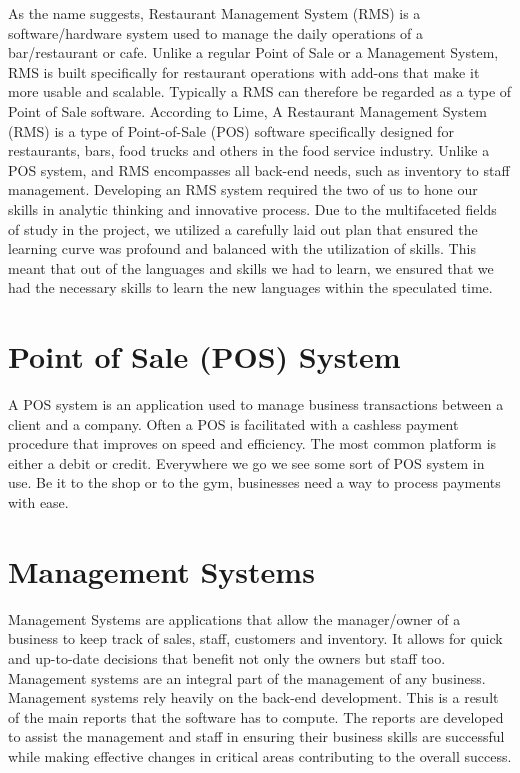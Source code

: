 As the name suggests, Restaurant Management System (RMS) is a software/hardware system used to manage the daily operations of a bar/restaurant or cafe. Unlike a regular Point of Sale or a Management System, RMS is built specifically for restaurant operations with add-ons that make it more usable and scalable. Typically a RMS can therefore be regarded as a type of Point of Sale software.
\newline
\newline
According to Lime, A Restaurant Management System (RMS) is a type of Point-of-Sale (POS) software specifically designed for restaurants, bars, food trucks and others in the food service industry. Unlike a POS system, and RMS encompasses all back-end needs, such as inventory to staff management\cite{RMS}.
\newline
\newline
Developing an RMS system required the two of us to hone our skills in analytic thinking and innovative process. Due to the multifaceted fields of study in the project, we utilized a carefully laid out plan that ensured the learning curve was profound and balanced with the utilization of skills. This meant that out of the languages and skills we had to learn, we ensured that we had the necessary skills to learn the new languages within the speculated time. 

\section{Point of Sale (POS) System}

A POS system is an application used to manage business transactions between a client and a company. Often a POS is facilitated with a cashless payment procedure that improves on speed and efficiency. The most common platform is either a debit or credit. Everywhere we go we see some sort of POS system in use. Be it to the shop or to the gym, businesses need a way to process payments with ease. 

\section{Management Systems}

Management Systems are applications that allow the manager/owner of a business to keep track of sales, staff, customers and inventory. It allows for quick and up-to-date decisions that benefit not only the owners but staff too. Management systems are an integral part of the management of any business. Management systems rely heavily on the back-end development. This is a result of the main reports that the software has to compute. The reports are developed to assist the management and staff in ensuring their business skills are successful while making effective changes in critical areas contributing to the overall success. 



